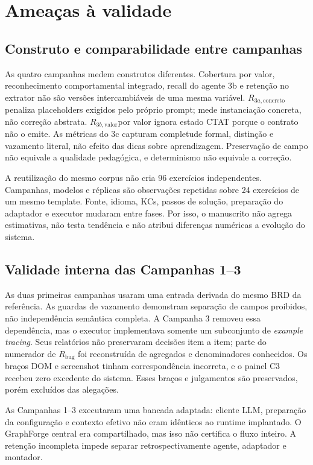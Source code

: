 \documentclass[11pt,a4paper]{article}
\newcommand{\Rthreea}{\ensuremath{R_{3a,\mathrm{concreto}}}}
\newcommand{\Rthreeb}{\ensuremath{R_{3b,\mathrm{valor}}}}
\newcommand{\Rbug}{\ensuremath{R_{\mathrm{bug}}}}
\begin{document}
\section{Ameaças à validade}

\subsection{Construto e comparabilidade entre campanhas}

As quatro campanhas medem construtos diferentes. Cobertura por valor, reconhecimento comportamental integrado, recall do agente 3b e retenção no extrator não são versões intercambiáveis de uma mesma variável. \Rthreea penaliza placeholders exigidos pelo próprio prompt; mede instanciação concreta, não correção abstrata. \Rthreeb por valor ignora estado CTAT porque o contrato não o emite. As métricas do 3c capturam completude formal, distinção e vazamento literal, não efeito das dicas sobre aprendizagem. Preservação de campo não equivale a qualidade pedagógica, e determinismo não equivale a correção.

A reutilização do mesmo corpus não cria 96 exercícios independentes. Campanhas, modelos e réplicas são observações repetidas sobre 24 exercícios de um mesmo template. Fonte, idioma, KCs, passos de solução, preparação do adaptador e executor mudaram entre fases. Por isso, o manuscrito não agrega estimativas, não testa tendência e não atribui diferenças numéricas a evolução do sistema.

\subsection{Validade interna das Campanhas 1--3}

As duas primeiras campanhas usaram uma entrada derivada do mesmo BRD da referência. As guardas de vazamento demonstram separação de campos proibidos, não independência semântica completa. A Campanha 3 removeu essa dependência, mas o executor implementava somente um subconjunto de \emph{example tracing}. Seus relatórios não preservaram decisões item a item; parte do numerador de \Rbug{} foi reconstruída de agregados e denominadores conhecidos. Os braços DOM e screenshot tinham correspondência incorreta, e o painel C3 recebeu zero excedente do sistema. Esses braços e julgamentos são preservados, porém excluídos das alegações.

As Campanhas 1--3 executaram uma bancada adaptada: cliente LLM, preparação da configuração e contexto efetivo não eram idênticos ao runtime implantado. O GraphForge central era compartilhado, mas isso não certifica o fluxo inteiro. A retenção incompleta impede separar retrospectivamente agente, adaptador e montador.
\end{document}
